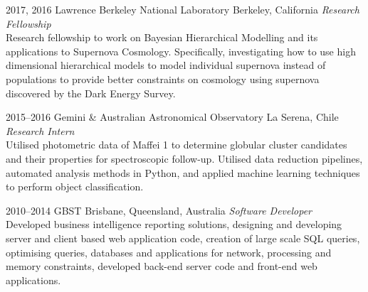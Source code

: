 \documentclass[]{friggeri-cv} %
\begin{document}
\begin{entrylist}

\entry
{2017, 2016}
{Lawrence Berkeley National Laboratory}
{Berkeley, California}
{\emph{Research Fellowship} \\
	Research fellowship to work on Bayesian Hierarchical Modelling and its applications to Supernova Cosmology. Specifically, investigating how to use high dimensional hierarchical models to model individual supernova instead of populations to provide better constraints on cosmology using supernova discovered by the Dark Energy Survey.}


\entry
{2015--2016}
{Gemini \& Australian Astronomical Observatory}
{La Serena, Chile}
{\emph{Research Intern} \\
Utilised photometric data of Maffei 1 to determine globular cluster candidates and their properties for spectroscopic follow-up. Utilised data reduction pipelines, automated analysis methods in Python, and applied machine learning techniques to perform object classification.}

\entry
{2010--2014}
{GBST}
{Brisbane, Queensland, Australia}
{\emph{Software Developer} \\
Developed business intelligence reporting solutions, designing and developing server and client based web application code, creation of large scale SQL queries, optimising queries, databases and applications for network, processing and memory constraints, developed back-end server code and front-end web applications.}


\end{entrylist}
\end{document}
